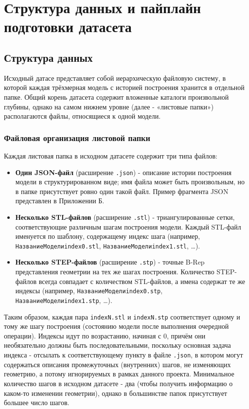 
\section{Структура данных и пайплайн подготовки датасета}
\label{sec:data-structure-pipeline-preprocessing}

\subsection{Структура данных}

Исходный датасе представляет собой иерархическую файловую систему, в которой каждая трёхмерная модель с историей построения хранится в отдельной папке. Общий корень датасета содержит вложенные каталоги произвольной глубины, однако на самом нижнем уровне (далее - «листовые папки») располагаются файлы, относящиеся к одной модели.

\subsubsection{Файловая организация листовой папки}

Каждая листовая папка в исходном датасете содержит три типа файлов:

\begin{itemize}
    \item \textbf{Один JSON-файл} (расширение \texttt{.json}) - описание истории построения модели в структурированном виде; имя файла может быть произвольным, но в папке присутствует ровно один такой файл. Пример фрагмента JSON представлен в Приложении Б.
    \item \textbf{Несколько STL-файлов} (расширение \texttt{.stl}) - триангулированные сетки, соответствующие различным шагам построения модели. Каждый STL-файл именуется по шаблону, содержащему индекс шага (например, \texttt{НазваниеМоделиindex0.stl}, \texttt{НазваниеМоделиindex1.stl}, \dots).
    \item \textbf{Несколько STEP-файлов} (расширение \texttt{.stp}) - точные B-Rep представления геометрии на тех же шагах построения. Количество STEP-файлов всегда совпадает с количеством STL-файлов, а имена содержат те же индексы (например, \texttt{НазваниеМоделиindex0.stp}, \texttt{НазваниеМоделиindex1.stp}, \dots).
\end{itemize}

Таким образом, каждая пара \texttt{indexN.stl} и \texttt{indexN.stp} соответствует одному и тому же шагу построения (состоянию модели после выполнения очередной операции). Индексы идут по возрастанию, начиная с 0, причём они необязательно должны быть последовательными, поскольку основная задача индекса - отсылать к соответствующему пункту в файле \texttt{.json}, в котором могут содержаться описания промежуточных (внутренних) шагов, не изменяющих геометрию, а потому игнорируемых в рамках данного проекта. Минимальное количество шагов в исходном датасете - два (чтобы получить информацию о каком-то изменении геометрии), однако в большинстве папок присутствует большее число шагов.

